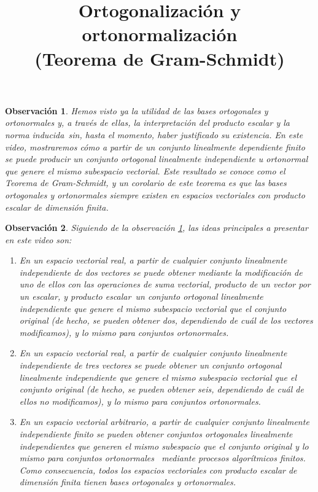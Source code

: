 \documentclass[12pt,dvipsnames]{article}
\newtheorem{obs}{Observación}[section]
\numberwithin{equation}{section}
\begin{document}
\title{Ortogonalización y ortonormalización \\ (Teorema de Gram-Schmidt)}
\date{}
\maketitle

\begin{obs}\label{obs:1}
    Hemos visto ya la utilidad de las bases ortogonales y ortonormales \textemdash y, a través de ellas, la interpretación del producto escalar y la norma inducida\textemdash \ sin, hasta el momento, haber justificado su existencia. En este video, mostraremos cómo a partir de un conjunto linealmente dependiente finito se puede producir un conjunto ortogonal linealmente independiente u ortonormal que genere el mismo subespacio vectorial. Este resultado se conoce como el Teorema de Gram-Schmidt, y un corolario de este teorema es que las bases ortogonales y ortonormales siempre existen en espacios vectoriales con producto escalar de dimensión finita.
\end{obs}

\begin{obs}
Siguiendo de la observación \ref{obs:1}, las ideas principales a presentar en este video son:

\begin{enumerate}[label=(\roman*)]
    \item En un espacio vectorial real, a partir de cualquier conjunto linealmente independiente de dos vectores se puede obtener \textemdash mediante la modificación de uno de ellos con las operaciones de suma vectorial, producto de un vector por un escalar, y producto escalar\textemdash \ un conjunto ortogonal linealmente independiente que genere el mismo subespacio vectorial que el conjunto original (de hecho, se pueden obtener dos, dependiendo de cuál de los vectores modificamos), y lo mismo para conjuntos ortonormales.
    
    \item En un espacio vectorial real, a partir de cualquier conjunto linealmente independiente de tres vectores se puede obtener un conjunto ortogonal linealmente independiente que genere el mismo subespacio vectorial que el conjunto original (de hecho, se pueden obtener seis, dependiendo de cuál de ellos no modificamos), y lo mismo para conjuntos ortonormales.

    \item En un espacio vectorial arbitrario, a partir de cualquier conjunto linealmente independiente finito se pueden obtener conjuntos ortogonales linealmente independientes que generen el mismo subespacio que el conjunto original \textemdash y lo mismo para conjuntos ortonormales \textemdash \ mediante procesos algorítmicos finitos. Como consecuencia, todos los espacios vectoriales con producto escalar de dimensión finita tienen bases ortogonales y ortonormales.
\end{enumerate}
\end{obs}
\end{document}
